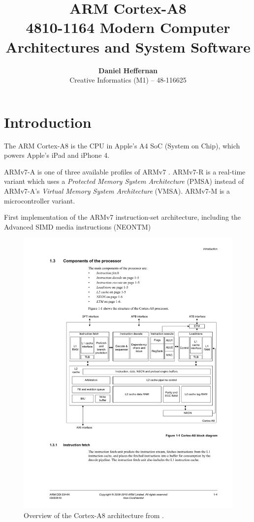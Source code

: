 \documentclass[oneside,a4paper]{report}
\title{ \textbf{ARM Cortex-A8} \\ \large{4810-1164 Modern Computer Architectures and System Software}}
\author{ \textbf{Daniel Heffernan} \\ Creative Informatics (M1) -- 48-116625 }
\begin{document}
\ifpdf
{}
\else
{}
\fi

\maketitle

\chapter{Introduction}

The ARM Cortex-A8 is the CPU in Apple's A4 SoC (System on Chip), which powers Apple's iPad and iPhone 4.

ARMv7-A is one of three available profiles of ARMv7 \cite[p. A1-4]{ARMRef}. ARMv7-R is a real-time variant which uses a \emph{Protected Memory System Architecture} (PMSA) instead of ARMv7-A's \emph{Virtual Memory System Architecture} (VMSA). ARMv7-M is a microcontroller variant.

First implementation of the ARMv7 instruction-set architecture, including the Advanced SIMD media instructions (NEONTM)

\begin{figure}[htbp]
	\centering
	\includegraphics{./fig/CortexA8.pdf}
	\caption{Overview of the Cortex-A8 architecture from \cite[p. 1-4]{A8Ref}.}
	\label{fig:cortexa8}
\end{figure}
\end{document}
